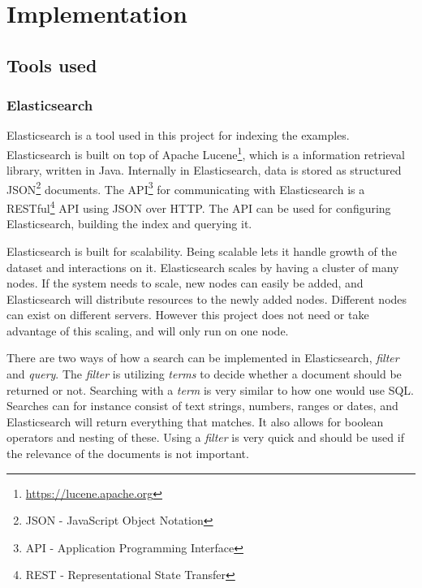 
\chapter{Implementation}\label{cap_4}

\section{Tools used}

\subsection{Elasticsearch} \label{elasticsearch}
Elasticsearch is a tool used in this project for indexing the examples. Elasticsearch is built on top of Apache Lucene\footnote{\url{https://lucene.apache.org}}, which is a information retrieval library, written in Java. Internally in Elasticsearch, data is stored as structured JSON\footnote{JSON - JavaScript Object Notation} documents. The API\footnote{API - Application Programming Interface} for communicating with Elasticsearch is a RESTful\footnote{REST - Representational State Transfer} API using JSON over HTTP. The API can be used for configuring Elasticsearch, building the index and querying it. 

Elasticsearch is built for scalability. Being scalable lets it handle growth of the dataset and interactions on it. Elasticsearch scales by having a cluster of many nodes. If the system needs to scale, new nodes can easily be added, and Elasticsearch will distribute resources to the newly added nodes. Different nodes can exist on different servers. However this project does not need or take advantage of this scaling, and will only run on one node.

There are two ways of how a search can be implemented in Elasticsearch, \textit{filter} and \textit{query}. The \textit{filter} is utilizing \textit{terms} to decide whether a document should be returned or not. Searching with a \textit{term} is very similar to how one would use SQL. 
Searches can for instance consist of text strings, numbers, ranges or dates, and Elasticsearch will return everything that matches. It also allows for boolean operators and nesting of these. Using a \textit{filter} is very quick and should be used if the relevance of the documents is not important.

